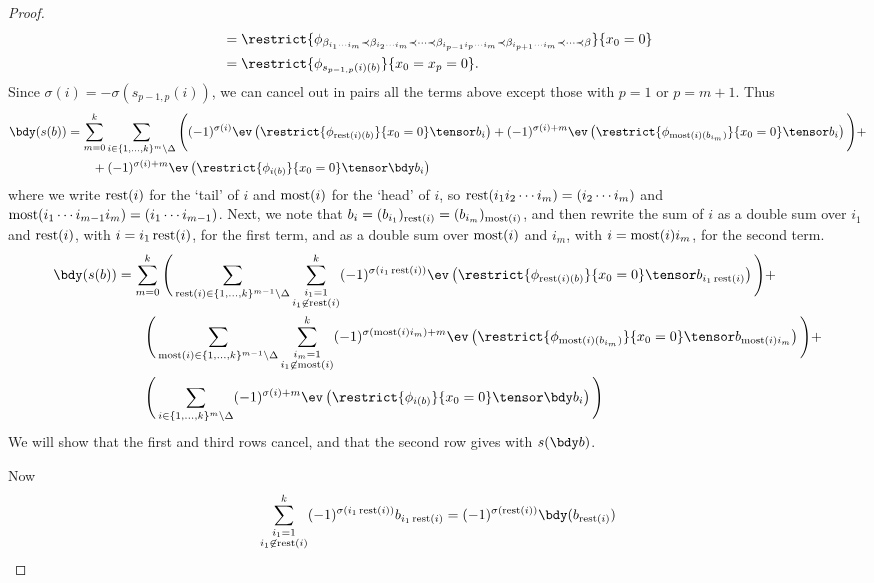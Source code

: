 \begin{proof}
\begin{align*}
	& = \restrict{\phi_{\beta_{i_1\cdots i_m} \prec \beta_{i_2 \cdots i_m} \prec \cdots \prec \beta_{i_{p-1} i_p \cdots i_m} \prec \beta_{i_{p+1} \cdots i_m} \prec \cdots \prec \beta}}{x_0=0} \\
	& = \restrict{\phi_{s_{p-1,p}(i)(b)}}{x_0=x_p=0}.
\end{align*}
Since $\sigma(i) = - \sigma(s_{p-1,p}(i))$, we can cancel out in pairs all the terms above except those with $p=1$ or $p=m+1$. Thus
\begin{align*}
\bdy(s(b)) & = \sum_{m=0}^{k} \sum_{i \in \{1, \ldots, k\}^{m} \setminus \Delta} \Bigg((-1)^{\sigma(i)} \ev\left(\restrict{\phi_{\rest(i)(b)}}{x_0 = 0}\tensor b_i\right) + (-1)^{\sigma(i) + m} \ev\left(\restrict{\phi_{\most(i)(b_{i_m})}}{x_0 = 0}\tensor b_i\right)\Bigg) + \\
	& \qquad + (-1)^{\sigma(i) + m} \ev\left(\restrict{\phi_{i(b)}}{x_0 = 0} \tensor \bdy b_i\right)
\end{align*}
where we write $\operatorname{rest}(i)$ for the `tail' of $i$ and $\operatorname{most}(i)$ for the `head' of $i$, so $\operatorname{rest}(i_1 i_2 \cdots i_m) = (i_2 \cdots i_m)$ and $\operatorname{most}(i_1 \cdots i_{m-1} i_m) = (i_1 \cdots i_{m-1})$. Next, we note that $b_i = (b_{i_1})_{\operatorname{rest}(i)} = (b_{i_m})_{\operatorname{most}(i)}$, and then rewrite the sum of $i$ as a double sum over $i_1$ and $\operatorname{rest}(i)$, with $i = i_1\operatorname{rest}(i)$, for the first term, and as a double sum over $\operatorname{most}(i)$ and $i_m$, with $i = \operatorname{most}(i)i_m$, for the second term.
\begin{align*}
\bdy(s(b)) & = \sum_{m=0}^{k} \Bigg( \sum_{\rest(i) \in \{1, \ldots, k\}^{m-1} \setminus \Delta} \sum_{\substack{i_1 = 1 \\ i_1 \not\in \rest(i)}}^{k}  (-1)^{\sigma(i_1\rest(i))} \ev\left(\restrict{\phi_{\rest(i)(b)}}{x_0 = 0}\tensor b_{i_1\rest(i)}\right) \Bigg)+ \\
	& \qquad \Bigg( \sum_{\most(i) \in \{1, \ldots, k\}^{m-1} \setminus \Delta} \sum_{\substack{i_m = 1 \\ i_1 \not\in \most(i)}}^{k}  (-1)^{\sigma(\most(i) i_m) + m} \ev\left(\restrict{\phi_{\most(i)(b_{i_m})}}{x_0 = 0}\tensor b_{\most(i) i_m}\right)\Bigg) + \\
	& \qquad \Bigg( \sum_{i \in \{1, \ldots, k\}^{m} \setminus \Delta} (-1)^{\sigma(i) + m} \ev\left(\restrict{\phi_{i(b)}}{x_0 = 0} \tensor \bdy b_i\right)\Bigg)
\end{align*}
We will show that the first and third rows cancel, and that the second row gives with $s(\bdy b)$.

Now $$\sum_{\substack{i_1 = 1 \\ i_1 \not\in \rest(i)}}^{k} (-1)^{\sigma(i_1\rest(i))} b_{i_1\rest(i)} = (-1)^{\sigma(\rest(i))} \bdy (b_{\rest(i)})$$



\end{proof}

